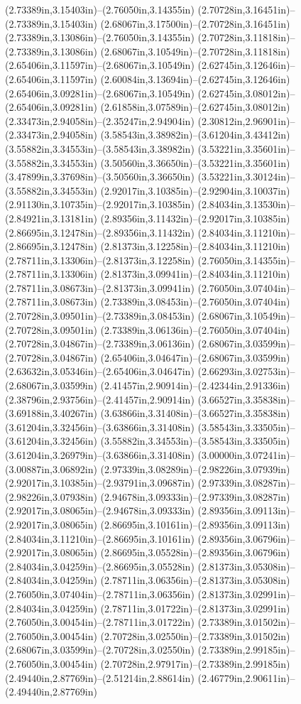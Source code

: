 (2.73389in,3.15403in)--(2.76050in,3.14355in) (2.70728in,3.16451in)--(2.73389in,3.15403in) (2.68067in,3.17500in)--(2.70728in,3.16451in) (2.73389in,3.13086in)--(2.76050in,3.14355in) (2.70728in,3.11818in)--(2.73389in,3.13086in) (2.68067in,3.10549in)--(2.70728in,3.11818in) (2.65406in,3.11597in)--(2.68067in,3.10549in) (2.62745in,3.12646in)--(2.65406in,3.11597in) (2.60084in,3.13694in)--(2.62745in,3.12646in) (2.65406in,3.09281in)--(2.68067in,3.10549in) (2.62745in,3.08012in)--(2.65406in,3.09281in) (2.61858in,3.07589in)--(2.62745in,3.08012in) (2.33473in,2.94058in)--(2.35247in,2.94904in) (2.30812in,2.96901in)--(2.33473in,2.94058in) (3.58543in,3.38982in)--(3.61204in,3.43412in) (3.55882in,3.34553in)--(3.58543in,3.38982in) (3.53221in,3.35601in)--(3.55882in,3.34553in) (3.50560in,3.36650in)--(3.53221in,3.35601in) (3.47899in,3.37698in)--(3.50560in,3.36650in) (3.53221in,3.30124in)--(3.55882in,3.34553in) (2.92017in,3.10385in)--(2.92904in,3.10037in) (2.91130in,3.10735in)--(2.92017in,3.10385in) (2.84034in,3.13530in)--(2.84921in,3.13181in) (2.89356in,3.11432in)--(2.92017in,3.10385in) (2.86695in,3.12478in)--(2.89356in,3.11432in) (2.84034in,3.11210in)--(2.86695in,3.12478in) (2.81373in,3.12258in)--(2.84034in,3.11210in) (2.78711in,3.13306in)--(2.81373in,3.12258in) (2.76050in,3.14355in)--(2.78711in,3.13306in) (2.81373in,3.09941in)--(2.84034in,3.11210in) (2.78711in,3.08673in)--(2.81373in,3.09941in) (2.76050in,3.07404in)--(2.78711in,3.08673in) (2.73389in,3.08453in)--(2.76050in,3.07404in) (2.70728in,3.09501in)--(2.73389in,3.08453in) (2.68067in,3.10549in)--(2.70728in,3.09501in) (2.73389in,3.06136in)--(2.76050in,3.07404in) (2.70728in,3.04867in)--(2.73389in,3.06136in) (2.68067in,3.03599in)--(2.70728in,3.04867in) (2.65406in,3.04647in)--(2.68067in,3.03599in) (2.63632in,3.05346in)--(2.65406in,3.04647in) (2.66293in,3.02753in)--(2.68067in,3.03599in) (2.41457in,2.90914in)--(2.42344in,2.91336in) (2.38796in,2.93756in)--(2.41457in,2.90914in) (3.66527in,3.35838in)--(3.69188in,3.40267in) (3.63866in,3.31408in)--(3.66527in,3.35838in) (3.61204in,3.32456in)--(3.63866in,3.31408in) (3.58543in,3.33505in)--(3.61204in,3.32456in) (3.55882in,3.34553in)--(3.58543in,3.33505in) (3.61204in,3.26979in)--(3.63866in,3.31408in) (3.00000in,3.07241in)--(3.00887in,3.06892in) (2.97339in,3.08289in)--(2.98226in,3.07939in) (2.92017in,3.10385in)--(2.93791in,3.09687in) (2.97339in,3.08287in)--(2.98226in,3.07938in) (2.94678in,3.09333in)--(2.97339in,3.08287in) (2.92017in,3.08065in)--(2.94678in,3.09333in) (2.89356in,3.09113in)--(2.92017in,3.08065in) (2.86695in,3.10161in)--(2.89356in,3.09113in) (2.84034in,3.11210in)--(2.86695in,3.10161in) (2.89356in,3.06796in)--(2.92017in,3.08065in) (2.86695in,3.05528in)--(2.89356in,3.06796in) (2.84034in,3.04259in)--(2.86695in,3.05528in) (2.81373in,3.05308in)--(2.84034in,3.04259in) (2.78711in,3.06356in)--(2.81373in,3.05308in) (2.76050in,3.07404in)--(2.78711in,3.06356in) (2.81373in,3.02991in)--(2.84034in,3.04259in) (2.78711in,3.01722in)--(2.81373in,3.02991in) (2.76050in,3.00454in)--(2.78711in,3.01722in) (2.73389in,3.01502in)--(2.76050in,3.00454in) (2.70728in,3.02550in)--(2.73389in,3.01502in) (2.68067in,3.03599in)--(2.70728in,3.02550in) (2.73389in,2.99185in)--(2.76050in,3.00454in) (2.70728in,2.97917in)--(2.73389in,2.99185in) (2.49440in,2.87769in)--(2.51214in,2.88614in) (2.46779in,2.90611in)--(2.49440in,2.87769in) 